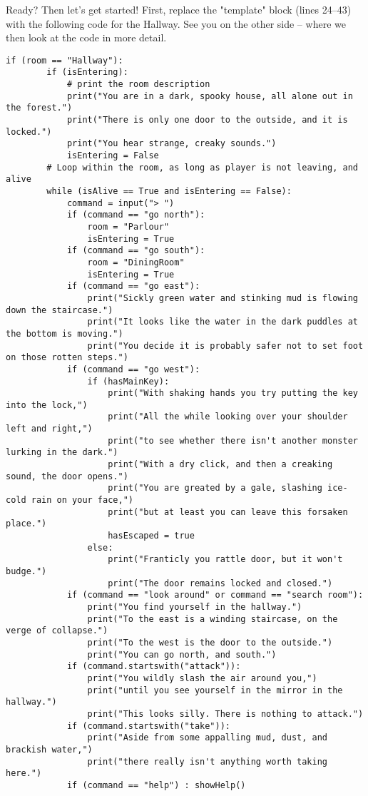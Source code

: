 Ready? Then let's get started! First, replace the "template" block (lines 24--43) with the following code for the Hallway. See you on the other side -- where we then look at the code in more detail.   

\begin{lstlisting}[firstnumber=24]
    if (room == "Hallway"):
        if (isEntering):
            # print the room description
            print("You are in a dark, spooky house, all alone out in the forest.")
            print("There is only one door to the outside, and it is locked.")
            print("You hear strange, creaky sounds.")
            isEntering = False
        # Loop within the room, as long as player is not leaving, and alive
        while (isAlive == True and isEntering == False):
            command = input("> ")
            if (command == "go north"):
                room = "Parlour"
                isEntering = True
            if (command == "go south"):
                room = "DiningRoom"
                isEntering = True
            if (command == "go east"):
                print("Sickly green water and stinking mud is flowing down the staircase.")
                print("It looks like the water in the dark puddles at the bottom is moving.")
                print("You decide it is probably safer not to set foot on those rotten steps.")
            if (command == "go west"):
                if (hasMainKey):
                    print("With shaking hands you try putting the key into the lock,")
                    print("All the while looking over your shoulder left and right,")
                    print("to see whether there isn't another monster lurking in the dark.")
                    print("With a dry click, and then a creaking sound, the door opens.")
                    print("You are greated by a gale, slashing ice-cold rain on your face,")
                    print("but at least you can leave this forsaken place.")
                    hasEscaped = true
                else:
                    print("Franticly you rattle door, but it won't budge.")
                    print("The door remains locked and closed.")
            if (command == "look around" or command == "search room"):
                print("You find yourself in the hallway.")
                print("To the east is a winding staircase, on the verge of collapse.")
                print("To the west is the door to the outside.")
                print("You can go north, and south.")
            if (command.startswith("attack")):
                print("You wildly slash the air around you,")
                print("until you see yourself in the mirror in the hallway.")
                print("This looks silly. There is nothing to attack.")
            if (command.startswith("take")):
                print("Aside from some appalling mud, dust, and brackish water,")
                print("there really isn't anything worth taking here.")
            if (command == "help") : showHelp()
\end{lstlisting} 

